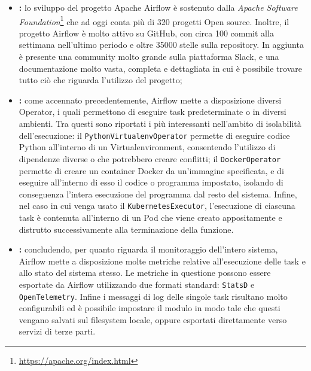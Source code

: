 \begin{itemize}
  \item \textbf{:} lo sviluppo del progetto Apache
    Airflow è sostenuto dalla \textit{Apache Software Foundation}\footnote{\url{https://apache.org/index.html}}
    che ad oggi conta più di 320 progetti Open source. Inoltre, il progetto
    Airflow è molto attivo su GitHub, con circa 100 commit alla settimana nell'ultimo
    periodo e oltre \num{35000} stelle sulla repository. In aggiunta è presente una
    community molto grande sulla piattaforma Slack, e una documentazione molto
    vasta, completa e dettagliata in cui è possibile trovare tutto ciò che riguarda
    l'utilizzo del progetto;

  \item \textbf{:} come accennato precedentemente, Airflow
    mette a disposizione diversi Operator, i quali permettono di eseguire task
    predeterminate o in diversi ambienti. Tra questi sono riportati i più interessanti
    nell'ambito di isolabilità dell'esecuzione: il \texttt{PythonVirtualenvOperator}
    permette di eseguire codice Python all'interno di un Virtualenvironment,
    consentendo l'utilizzo di dipendenze diverse o che potrebbero creare
    conflitti; il \texttt{DockerOperator} permette di creare un container Docker
    da un'immagine specificata, e di eseguire all'interno di esso il codice o programma
    impostato, isolando di conseguenza l'intera esecuzione del programma dal
    resto del sistema. Infine, nel caso in cui venga usato il \texttt{KubernetesExecutor},
    l'esecuzione di ciascuna task è contenuta all'interno di un Pod che viene
    creato appositamente e distrutto successivamente alla terminazione della
    funzione.

  \item \textbf{:} concludendo, per quanto riguarda il monitoraggio
    dell'intero sistema, Airflow mette a disposizione molte metriche relative
    all'esecuzione delle task e allo stato del sistema stesso. Le metriche in questione
    possono essere esportate da Airflow utilizzando due formati standard:
    \texttt{StatsD} e \texttt{OpenTelemetry}. Infine i messaggi di log delle singole
    task risultano molto configurabili ed è possibile impostare il modulo in modo
    tale che questi vengano salvati sul filesystem locale, oppure esportati
    direttamente verso servizi di terze parti.
\end{itemize}